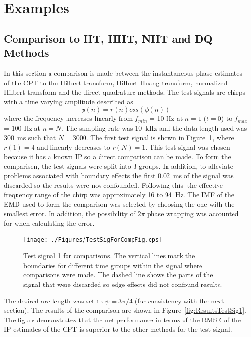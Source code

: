 \documentclass[a4paper]{IEEEtran}
\begin{document}
\section{Examples}
\subsection{Comparison to HT, HHT, NHT and DQ Methods}
In this section a comparison is made between the instantaneous phase estimates of the CPT to the Hilbert transform, Hilbert-Huang transform, normalized Hilbert transform and the direct quadrature methods. The test signals are chirps with a time varying amplitude described as
\begin{equation}\label{TestSigNoNoise}
    y(n)=r\left(n\right)cos\left(\phi\left(n\right)\right)
\end{equation}
where the frequency increases linearly from $f_{min}$ = 10 Hz at $n=1$ ($t=0$) to $f_{max}$ = 100 Hz at $n=N$. The sampling rate was 10~kHz and the data length used was 300~ms such that $N = 3000$. The first test signal is shown in Figure~\ref{fig:TestSig1}, where $r(1) = 4$ and linearly decreases to $r(N) = 1$. This test signal was chosen because it has a known IP so a direct comparison can be made. To form the comparison, the test signals were split into 3 groups. In addition, to alleviate problems associated with boundary effects the first 0.02~ms of the signal was discarded so the results were not confounded. Following this, the effective frequency range of the chirp was approximately 16 to 94~Hz. The IMF of the EMD used to form the comparison was selected by choosing the one with the smallest error. In addition, the possibility of $2\pi$ phase wrapping was accounted for when calculating the error.

\begin{figure}[htbp]
	\centering
		\texttt{[image: ./Figures/TestSigForCompFig.eps]}
	\caption{Test signal 1 for comparisons. The vertical lines mark the boundaries for different time groups within the signal where comparisons were made. The dashed line shows the parts of the signal that were discarded so edge effects did not confound results.}
	\label{fig:TestSig1}
\end{figure}

The desired arc length was set to $\psi=3\pi/4$ (for consistency with the next section). The results of the comparison are shown in Figure~\ref{fig:ResultsTestSig1}. The figure demonstrates that the net performance in terms of the RMSE of the IP estimates of the CPT is superior to the other methods for the test signal.
\end{document}
